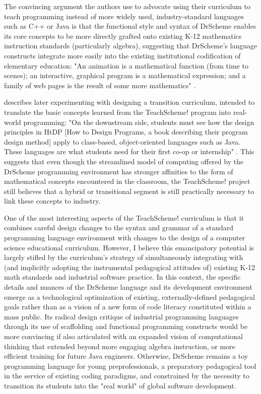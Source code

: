 The convincing argument the authors use to advocate using their curriculum to teach programming instead of more widely used, industry-standard languages such as C++ or Java is that the functional style and syntax of DrScheme enables its core concepts to be more directly grafted onto existing K-12 mathematics instruction standards (particularly algebra), suggesting that DrScheme's language constructs integrate more easily into the existing institutional codification of elementary education: "An animation is a mathematical function (from time to scenes); an interactive, graphical program is a mathematical expression; and a family of web pages is the result of some more mathematics" \autocite[129]{Felleisen10}.

\citeauthor{Felleisen10} describes later experimenting with designing a transition curriculum, intended to translate the basic concepts learned from the TeachScheme! program into real-world programming: "On the downstream side, students must see how the design principles in HtDP [How to Design Programs, a book describing their program design method] apply to class-based, object-oriented languages such as Java. These languages are what students need for their first co-op or internship" \autocite[130]{Felleisen10}. This suggests that even though the streamlined model of computing offered by the DrScheme programming environment has stronger affinities to the form of mathematical concepts encountered in the classroom, the TeachScheme! project still believes that a hybrid or transitional segment is still practically necessary to link these concepts to industry.

One of the most interesting aspects of the TeachScheme! curriculum is that it combines careful design changes to the syntax and grammar of a standard programming language environment with changes to the design of a computer science educational curriculum. However, I believe this emancipatory potential is largely stifled by the curriculum's strategy of simultaneously integrating with (and implicitly adopting the instrumental pedagogical attitudes of) existing K-12 math standards and industrial software practice. In this context, the specific details and nuances of the DrScheme language and its development environment emerge as a technological optimization of existing, externally-defined pedagogical goals rather than as a vision of a new form of code literacy constituted within a mass public. Its radical design critique of industrial programming languages through its use of scaffolding and functional programming constructs would be more convincing if also articulated with an expanded vision of computational thinking that extended beyond more engaging algebra instruction, or more efficient training for future Java engineers. Otherwise, DrScheme remains a toy programming language for young preprofessionals, a preparatory pedagogical tool in the service of existing coding paradigms, and constrained by the necessity to transition its students into the "real world" of global software development.


